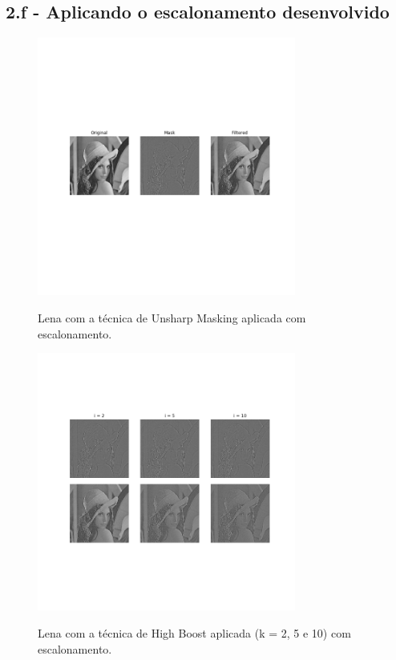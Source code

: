 \documentclass{article}
\begin{document}
\subsection*{2.f - Aplicando o escalonamento desenvolvido}

\begin{figure}[H]
	\label{fig:lena_mask_with_scalling}
	\begin{minipage}[b]{1.0\linewidth}
		\centering
		\centerline{\includegraphics[width=8.5cm]{Figures/unsharp_mask_with_scalling}}
		Lena com a técnica de Unsharp Masking aplicada com escalonamento.\medskip
	\end{minipage}
\end{figure}

\begin{figure}[H]
	\label{fig:lena_boost_with_scalling}
	\begin{minipage}[b]{1.0\linewidth}
		\centering
		\centerline{\includegraphics[width=8.5cm]{Figures/high_boost_with_scalling}}
		Lena com a técnica de High Boost aplicada (k = 2, 5 e 10) com escalonamento.\medskip
	\end{minipage}
\end{figure}
\newpage
\end{document}
